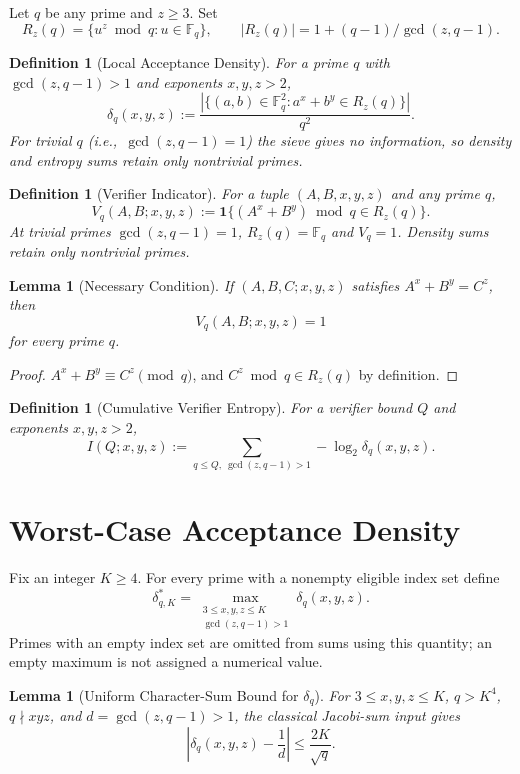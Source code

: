 \documentclass[11pt,a4paper]{article}
\newtheorem{lemma}[theorem]{Lemma}
\newtheorem{definition}[theorem]{Definition}
\begin{document}
Let $q$ be any prime and $z \ge 3$. Set
\[
  R_z(q) = \{u^z \bmod q : u \in \mathbb{F}_q\},
  \qquad
  |R_z(q)| = 1 + (q-1)/\gcd(z,q-1).
\]

\begin{definition}[Local Acceptance Density]
\label{def:delta}
For a prime $q$ with $\gcd(z,q-1)>1$ and exponents $x,y,z>2$,
\[
  \delta_q(x,y,z) :=
    \frac{|\{(a,b)\in \mathbb{F}_q^2 : a^x+b^y \in R_z(q)\}|}{q^2}.
\]
For trivial $q$ (i.e.,\ $\gcd(z,q-1)=1$) the sieve gives no information,
so density and entropy sums retain only nontrivial primes.
\end{definition}

\begin{definition}[Verifier Indicator]
\label{def:Vq}
For a tuple $(A,B,x,y,z)$ and any prime $q$,
\[
  V_q(A,B;x,y,z) :=
    \mathbf{1}\bigl\{(A^x+B^y) \bmod q \in R_z(q)\bigr\}.
\]
At trivial primes $\gcd(z,q-1)=1$, $R_z(q)=\mathbb F_q$ and
$V_q=1$. Density sums retain only nontrivial primes.
\end{definition}

\begin{lemma}[Necessary Condition]
\label{lem:necessary}
If $(A,B,C;x,y,z)$ satisfies $A^x+B^y=C^z$, then
\[
  V_q(A,B;x,y,z)=1
\]
for every prime $q$.
\end{lemma}

\begin{proof}
$A^x+B^y \equiv C^z \pmod q$, and $C^z \bmod q \in R_z(q)$ by
definition.
\end{proof}

\begin{definition}[Cumulative Verifier Entropy]
\label{def:Iverifier}
For a verifier bound $Q$ and exponents $x,y,z>2$,
\[
  I(Q;x,y,z) := \sum_{q \le Q,\ \gcd(z,q-1)>1} -\log_2 \delta_q(x,y,z).
\]
\end{definition}

\section{Worst-Case Acceptance Density}

Fix an integer $K\ge4$. For every prime with a nonempty eligible
index set define
\[
 \delta_{q,K}^{*}=\max_{\substack{3\le x,y,z\le K\\
                         \gcd(z,q-1)>1}}\delta_q(x,y,z).
\]
Primes with an empty index set are omitted from sums using this
quantity; an empty maximum is not assigned a numerical value.

\begin{lemma}[Uniform Character-Sum Bound for $\delta_q$]
\label{lem:weil}
For $3\le x,y,z\le K$, $q>K^4$, $q\nmid xyz$, and
$d=\gcd(z,q-1)>1$, the classical Jacobi-sum input gives
\[
 \left|\delta_q(x,y,z)-\frac1d\right|\le\frac{2K}{\sqrt q}.
\]
\end{lemma}
\end{document}
